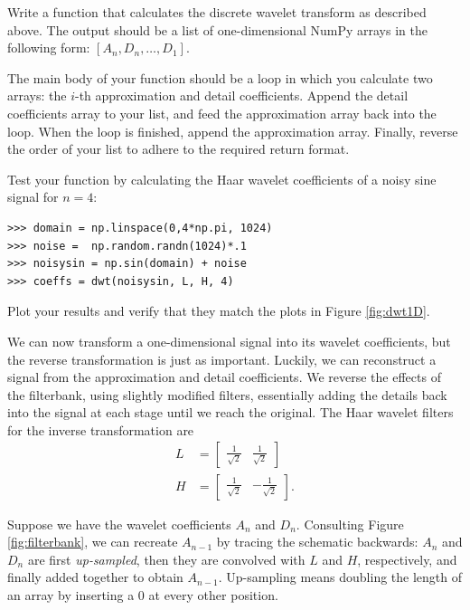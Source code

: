 \begin{problem}
Write a function that calculates the discrete wavelet transform as described above.
The output should be a list of one-dimensional NumPy arrays in the
following form: $[A_n, D_n, \ldots, D_1]$.

The main body of your function should be a loop in which you calculate two arrays: the $i$-th approximation
and detail coefficients. Append the detail coefficients array to your list, and feed the approximation array
back into the loop. When the loop is finished, append the approximation array. Finally, reverse the order of your list
to adhere to the required return format.

Test your function by calculating the Haar wavelet coefficients of a noisy sine signal for $n=4$:

\begin{lstlisting}
>>> domain = np.linspace(0,4*np.pi, 1024)
>>> noise =  np.random.randn(1024)*.1
>>> noisysin = np.sin(domain) + noise
>>> coeffs = dwt(noisysin, L, H, 4)
\end{lstlisting}

Plot your results and verify that they match the plots in Figure \ref{fig:dwt1D}.
\end{problem}

We can now transform a one-dimensional signal into its wavelet coefficients,
but the reverse transformation is just as important.
Luckily, we can reconstruct a signal from the approximation and detail coefficients.
We reverse the effects of the filterbank, using slightly modified filters, essentially adding the details back into the
signal at each stage until we reach the original.
The Haar wavelet filters for the inverse transformation are
\begin{align*}
L &= \begin{bmatrix}\frac{1}{\sqrt{2}} & \frac{1}{\sqrt{2}}\end{bmatrix}\\
H &= \begin{bmatrix}\frac{1}{\sqrt{2}} & -\frac{1}{\sqrt{2}}\end{bmatrix}.
\end{align*}

Suppose we have the wavelet coefficients $A_n$ and $D_n$. Consulting Figure \ref{fig:filterbank},
we can recreate $A_{n-1}$ by tracing the schematic backwards: $A_n$ and $D_n$ are first
\emph{up-sampled}, then they are convolved with $L$ and $H$, respectively, and finally
added together to obtain $A_{n-1}$. Up-sampling means doubling the length of an array
by inserting a 0 at every other position.

